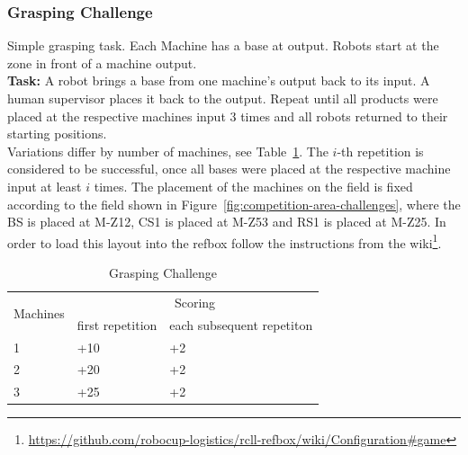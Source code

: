 \documentclass[12pt,twoside]{article}
\newcommand{\reffig}[1]{Figure~\ref{#1}}
\newcommand{\reftab}[1]{Table~\ref{#1}}
\begin{document}
\subsubsection{Grasping Challenge}\label{sec:challenge-grasping}
Simple grasping task.
Each Machine has a base at output.
Robots start at the zone in front of a machine output.\\
\textbf{Task:} A robot brings a base from one machine's output back to its
input. A human supervisor places it back to the output. Repeat until all
products were placed at the respective machines input 3 times and all robots
returned to their starting positions. \\
Variations differ by number of machines, see
\reftab{tab:challenge-grasping}. The $i$-th repetition is considered to be
successful, once all bases were placed at the respective machine input
at least $i$ times.
The placement of the machines on the field is fixed according to the field
shown in \reffig{fig:competition-area-challenges}, where the \ac{BS} is
placed at M-Z12, CS1 is placed at M-Z53 and \ac{RS}1 is placed at M-Z25.
In order to load this layout into the \ac{refbox} follow the instructions
from the
wiki\footnote{\url{https://github.com/robocup-logistics/rcll-refbox/wiki/Configuration\#game}}. %

\begin{table}[!htb]
\centering
 \begin{tabular}{l|l|l}
  \multirow{2}{*}{Machines}
  & \multicolumn{2}{c}{Scoring} \\\cline{2-3}
  & first repetition
  & each subsequent repetiton  \\\hline\hline
  1 & +10 & +2 \\
  2 & +20 & +2 \\
  3 & +25 & +2 \\
 \end{tabular}
 \caption{Grasping Challenge}
 \label{tab:challenge-grasping}
\end{table}
\end{document}
